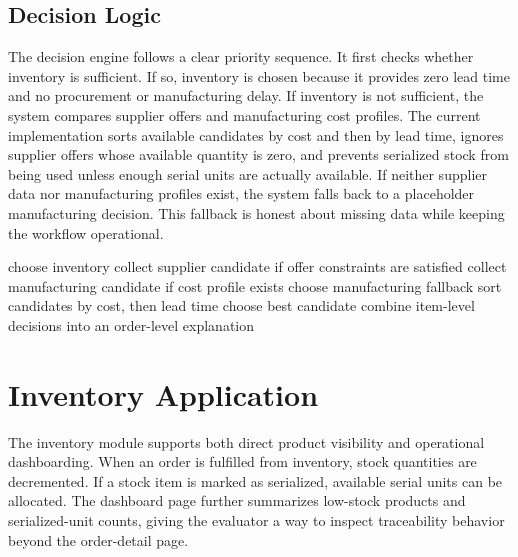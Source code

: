 \documentclass[12pt,letterpaper,oneside,openany]{book}
\begin{document}
\subsection{Decision Logic}

\begin{justifying}
The decision engine follows a clear priority sequence. It first checks whether
inventory is sufficient. If so, inventory is chosen because it provides zero
lead time and no procurement or manufacturing delay. If inventory is not
sufficient, the system compares supplier offers and manufacturing cost profiles.
The current implementation sorts available candidates by cost and then by lead
time, ignores supplier offers whose available quantity is zero, and prevents
serialized stock from being used unless enough serial units are actually
available. If neither supplier data nor manufacturing profiles exist, the
system falls back to a placeholder manufacturing decision. This fallback is
honest about missing data while keeping the workflow operational.
\end{justifying}

\begin{algorithm}[H]
\caption{Simplified order fulfillment decision}
\begin{algorithmic}[1]
        \State choose inventory
    \Else
        \State collect supplier candidate if offer constraints are satisfied
        \State collect manufacturing candidate if cost profile exists
            \State choose manufacturing fallback
        \Else
            \State sort candidates by cost, then lead time
            \State choose best candidate
        \EndIf
    \EndIf
\EndFor
\State combine item-level decisions into an order-level explanation
\end{algorithmic}
\label{alg:fulfillment2}
\end{algorithm}

\section{Inventory Application}

\begin{justifying}
The inventory module supports both direct product visibility and operational
dashboarding. When an order is fulfilled from inventory, stock quantities are
decremented. If a stock item is marked as serialized, available serial units
can be allocated. The dashboard page further summarizes low-stock products and
serialized-unit counts, giving the evaluator a way to inspect traceability
behavior beyond the order-detail page.
\end{justifying}
\end{document}
